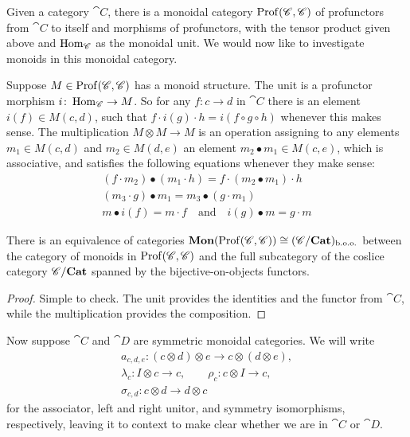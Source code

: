 Given a category $\cat{C}$, there is a monoidal category $\operatorname{Prof}(\mathscr{C},\mathscr{C})$ of profunctors from $\cat{C}$ to itself and morphisms of profunctors, with the tensor product given above and $\operatorname{Hom}_{\mathscr{C}}$ as the monoidal unit. We would now like to investigate monoids in this monoidal category.

Suppose $M\in\operatorname{Prof}(\mathscr{C},\mathscr{C})$ has a monoid structure. The unit is a profunctor morphism $i\colon\operatorname{Hom}_{\mathscr{C}}\to M$. So for any $f\colon c\to d$ in $\cat{C}$ there is an element $i(f)\in M(c,d)$, such that $f\cdot i(g)\cdot h = i(f\circ g\circ h)$ whenever this makes sense. The multiplication $M\otimes M\to M$ is an operation assigning to any elements $m_1\in M(c,d)$ and $m_2\in M(d,e)$ an element $m_2\bullet m_1\in M(c,e)$, which is associative, and satisfies the following equations whenever they make sense:
\begin{gather*}
	(f\cdot m_2)\bullet(m_1\cdot h) = f\cdot(m_2\bullet m_1)\cdot h \\
	(m_3\cdot g)\bullet m_1 = m_3\bullet(g\cdot m_1) \\
	m\bullet i(f) = m\cdot f \quad\text{and}\quad i(g)\bullet m = g\cdot m
\end{gather*}

\begin{lemma}
	There is an equivalence of categories $\mathbf{Mon}(\operatorname{Prof}(\mathscr{C},\mathscr{C}))\cong (\mathscr{C}/\mathbf{Cat})_{\text{b.o.o.}}$ between the category of monoids in $\operatorname{Prof}(\mathscr{C},\mathscr{C})$ and the full subcategory of the coslice category $\mathscr{C}/\mathbf{Cat}$ spanned by the bijective-on-objects functors.
\end{lemma}
\begin{proof}
	Simple to check. The unit provides the identities and the functor from $\cat{C}$, while the multiplication provides the composition.
\end{proof}

Now suppose $\cat{C}$ and $\cat{D}$ are symmetric monoidal categories. We will write
\begin{gather*}
	a_{c,d,e}\colon (c\otimes d)\otimes e \to c\otimes(d\otimes e), \\
		\lambda_c\colon I\otimes c\to c,
		\qquad \rho_c\colon c\otimes I \to c, \\
		\sigma_{c,d}\colon c\otimes d\to d\otimes c
\end{gather*}
for the associator, left and right unitor, and symmetry isomorphisms, respectively, leaving it to context to make clear whether we are in $\cat{C}$ or $\cat{D}$.

